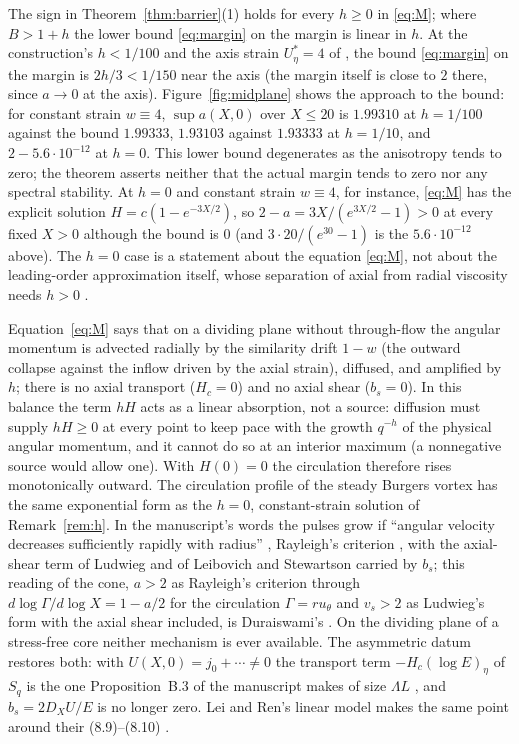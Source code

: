 \documentclass[11pt]{article}
\newcommand{\DX}{D_X}
\newcommand{\Hc}{H_c}
\newcommand{\bs}{b_s}
\newcommand{\vs}{v_s}
\newcommand{\Sq}{S_q}
\begin{document}
\begin{remark}\label{rem:h}
The sign in Theorem~\ref{thm:barrier}(1) holds for every $h\ge0$ in \eqref{eq:M}; where $B>1+h$ the lower bound \eqref{eq:margin} on the margin is linear in $h$. At the construction's $h<1/100$ and the axis strain $U^*_\eta=4$ of \cite[(B.1), p.~144]{OpenAINS}, the bound \eqref{eq:margin} on the margin is $2h/3<1/150$ near the axis (the margin itself is close to $2$ there, since $a\to0$ at the axis). Figure~\ref{fig:midplane} shows the approach to the bound: for constant strain $w\equiv4$, $\sup a(X,0)$ over $X\le20$ is $1.99310$ at $h=1/100$ against the bound $1.99333$, $1.93103$ against $1.93333$ at $h=1/10$, and $2-5.6\cdot10^{-12}$ at $h=0$. This lower bound degenerates as the anisotropy tends to zero; the theorem asserts neither that the actual margin tends to zero nor any spectral stability. At $h=0$ and constant strain $w\equiv4$, for instance, \eqref{eq:M} has the explicit solution $H=c(1-e^{-3X/2})$, so $2-a=3X/(e^{3X/2}-1)>0$ at every fixed $X>0$ although the bound is $0$ (and $3\cdot20/(e^{30}-1)$ is the $5.6\cdot10^{-12}$ above). The $h=0$ case is a statement about the equation \eqref{eq:M}, not about the leading-order approximation itself, whose separation of axial from radial viscosity needs $h>0$ \cite[p.~26]{OpenAINS}.
\end{remark}

\begin{remark}\label{rem:phys}
Equation~\eqref{eq:M} says that on a dividing plane without through-flow the angular momentum is advected radially by the similarity drift $1-w$ (the outward collapse against the inflow driven by the axial strain), diffused, and amplified by $h$; there is no axial transport ($\Hc=0$) and no axial shear ($\bs=0$). In this balance the term $hH$ acts as a linear absorption, not a source: diffusion must supply $hH\ge0$ at every point to keep pace with the growth $q^{-h}$ of the physical angular momentum, and it cannot do so at an interior maximum (a nonnegative source would allow one). With $H(0)=0$ the circulation therefore rises monotonically outward. The circulation profile of the steady Burgers vortex \cite{Burgers} has the same exponential form as the $h=0$, constant-strain solution of Remark~\ref{rem:h}. In the manuscript's words the pulses grow if ``angular velocity decreases sufficiently rapidly with radius'' \cite[p.~6]{OpenAINS}, Rayleigh's criterion \cite{Rayleigh}, with the axial-shear term of Ludwieg \cite{Ludwieg} and of Leibovich and Stewartson \cite{LS} carried by $\bs$; this reading of the cone, $a>2$ as Rayleigh's criterion through $d\log\Gamma/d\log X=1-a/2$ for the circulation $\Gamma=ru_\theta$ and $\vs>2$ as Ludwieg's form with the axial shear included, is Duraiswami's \cite[pp.~21--22]{Duraiswami}. On the dividing plane of a stress-free core neither mechanism is ever available. The asymmetric datum restores both: with $U(X,0)=j_0+\cdots\ne0$ the transport term $-\Hc(\log E)_\eta$ of $\Sq$ is the one Proposition~B.3 of the manuscript makes of size $\Lambda L$ \cite[(B.21), p.~149]{OpenAINS}, and $\bs=2\DX U/E$ is no longer zero. Lei and Ren's linear model makes the same point around their (8.9)--(8.10) \cite[pp.~107--109]{LeiRen}.
\end{remark}
\end{document}
